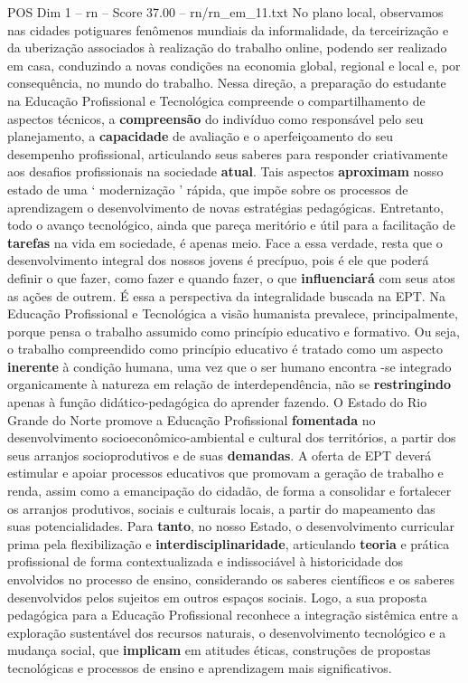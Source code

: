 \begin{textsample}{POS Dim 1 – rn – Score 37.00 – rn/rn\_em\_11.txt}
No plano local, observamos nas cidades potiguares fenômenos mundiais da informalidade, da terceirização e da uberização associados à realização do trabalho online, podendo ser realizado em casa, conduzindo a novas condições na economia global, regional e local e, por consequência, no mundo do trabalho.
Nessa direção, a preparação do estudante na Educação Profissional e Tecnológica compreende o compartilhamento de aspectos técnicos, a \textbf{compreensão} do indivíduo como responsável pelo seu planejamento, a \textbf{capacidade} de avaliação e o aperfeiçoamento do seu desempenho profissional, articulando seus saberes para responder criativamente aos desafios profissionais na sociedade \textbf{atual}.
Tais aspectos \textbf{aproximam} nosso estado de uma ‘ modernização ’ rápida, que impõe sobre os processos de aprendizagem o desenvolvimento de novas estratégias pedagógicas.
Entretanto, todo o avanço tecnológico, ainda que pareça meritório e útil para a facilitação de \textbf{tarefas} na vida em sociedade, é apenas meio.
Face a essa verdade, resta que o desenvolvimento integral dos nossos jovens é precípuo, pois é ele que poderá definir o que fazer, como fazer e quando fazer, o que \textbf{influenciará} com seus atos as ações de outrem.
É essa a perspectiva da integralidade buscada na EPT.
Na Educação Profissional e Tecnológica a visão humanista prevalece, principalmente, porque pensa o trabalho assumido como princípio educativo e formativo.
Ou seja, o trabalho compreendido como princípio educativo é tratado como um aspecto \textbf{inerente} à condição humana, uma vez que o ser humano encontra -se integrado organicamente à natureza em relação de interdependência, não se \textbf{restringindo} apenas à função didático-pedagógica do aprender fazendo.
O Estado do Rio Grande do Norte promove a Educação Profissional \textbf{fomentada} no desenvolvimento socioeconômico-ambiental e cultural dos territórios, a partir dos seus arranjos socioprodutivos e de suas \textbf{demandas}.
A oferta de EPT deverá estimular e apoiar processos educativos que promovam a geração de trabalho e renda, assim como a emancipação do cidadão, de forma a consolidar e fortalecer os arranjos produtivos, sociais e culturais locais, a partir do mapeamento das suas potencialidades.
Para \textbf{tanto}, no nosso Estado, o desenvolvimento curricular prima pela flexibilização e \textbf{interdisciplinaridade}, articulando \textbf{teoria} e prática profissional de forma contextualizada e indissociável à historicidade dos envolvidos no processo de ensino, considerando os saberes científicos e os saberes desenvolvidos pelos sujeitos em outros espaços sociais.
Logo, a sua proposta pedagógica para a Educação Profissional reconhece a integração sistêmica entre a exploração sustentável dos recursos naturais, o desenvolvimento tecnológico e a mudança social, que \textbf{implicam} em atitudes éticas, construções de propostas tecnológicas e processos de ensino e aprendizagem mais significativos.


\end{textsample}
